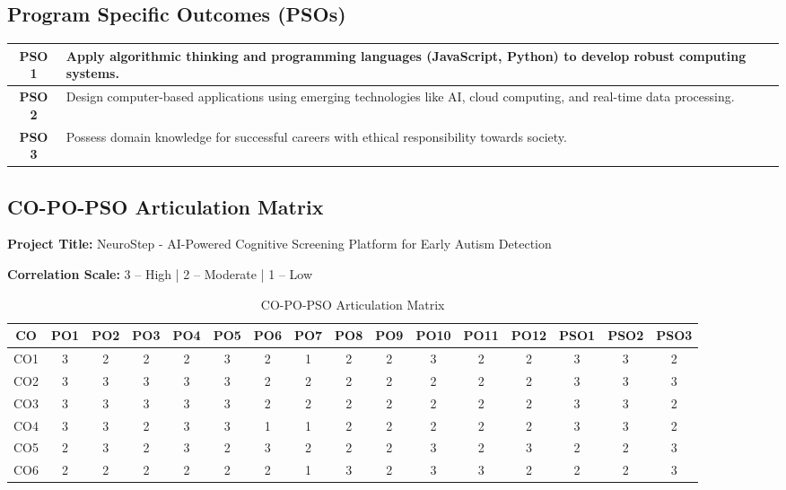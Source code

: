 \documentclass[12pt,letterpaper]{article}
\begin{document}
\subsection*{Program Specific Outcomes (PSOs)}

\begin{table}[H]
\centering
\begin{tabularx}{\textwidth}{|c|X|}
\hline
\textbf{PSO 1} & Apply algorithmic thinking and programming languages (JavaScript, Python) to develop robust computing systems. \\
\hline
\textbf{PSO 2} & Design computer-based applications using emerging technologies like AI, cloud computing, and real-time data processing. \\
\hline
\textbf{PSO 3} & Possess domain knowledge for successful careers with ethical responsibility towards society. \\
\hline
\end{tabularx}
\end{table}

\newpage

\subsection*{CO-PO-PSO Articulation Matrix}

\textbf{Project Title:} NeuroStep - AI-Powered Cognitive Screening Platform for Early Autism Detection

\textbf{Correlation Scale:} 3 -- High | 2 -- Moderate | 1 -- Low

\begin{table}[H]
\centering
\small
\begin{tabular}{|c|c|c|c|c|c|c|c|c|c|c|c|c|c|c|c|}
\hline
\textbf{CO} & \textbf{PO1} & \textbf{PO2} & \textbf{PO3} & \textbf{PO4} & \textbf{PO5} & \textbf{PO6} & \textbf{PO7} & \textbf{PO8} & \textbf{PO9} & \textbf{PO10} & \textbf{PO11} & \textbf{PO12} & \textbf{PSO1} & \textbf{PSO2} & \textbf{PSO3} \\
\hline
CO1 & 3 & 2 & 2 & 2 & 3 & 2 & 1 & 2 & 2 & 3 & 2 & 2 & 3 & 3 & 2 \\
\hline
CO2 & 3 & 3 & 3 & 3 & 3 & 2 & 2 & 2 & 2 & 2 & 2 & 2 & 3 & 3 & 3 \\
\hline
CO3 & 3 & 3 & 3 & 3 & 3 & 2 & 2 & 2 & 2 & 2 & 2 & 2 & 3 & 3 & 2 \\
\hline
CO4 & 3 & 3 & 2 & 3 & 3 & 1 & 1 & 2 & 2 & 2 & 2 & 2 & 3 & 3 & 2 \\
\hline
CO5 & 2 & 3 & 2 & 3 & 2 & 3 & 2 & 2 & 2 & 3 & 2 & 3 & 2 & 2 & 3 \\
\hline
CO6 & 2 & 2 & 2 & 2 & 2 & 2 & 1 & 3 & 2 & 3 & 3 & 2 & 2 & 2 & 3 \\
\hline
\end{tabular}
\caption{CO-PO-PSO Articulation Matrix}
\end{table}
\end{document}
